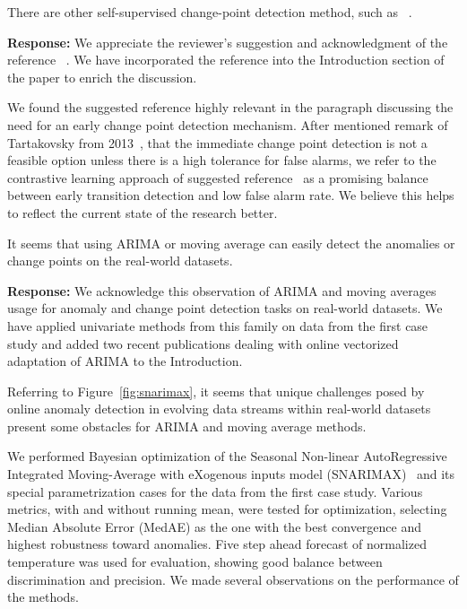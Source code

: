 \documentclass{article}
\makeatletter
\newenvironment{comment}{
\begin{sloppypar}\slshape
\vspace{5 mm}
\color{blue}
 \@beginparpenalty\@M
  \begin{list}{}{\setlength{\topsep}{0ex}%
  \setlength{\leftmargin}{\rightmargin}}\item[]
 \@beginparpenalty\@endparpenalty
}
{\end{list}
\end{sloppypar}
}
\makeatother
\begin{document}
\begin{enumerate}
  \item
        \begin{comment}
        There are other self-supervised change-point detection method, such as ~\cite{Deldari2021}.
        \end{comment}
        {\bf Response:}
        We appreciate the reviewer's suggestion and acknowledgment of the reference ~\cite{Deldari2021}. We have incorporated the reference into the Introduction section of the paper to enrich the discussion.

        We found the suggested reference highly relevant in the paragraph discussing the need for an early change point detection mechanism. After mentioned remark of Tartakovsky from 2013~\cite{Tartakovsky2013}, that the immediate change point detection is not a feasible option unless there is a high tolerance for false alarms, we refer to the contrastive learning approach of suggested reference~\cite{Deldari2021} as a promising balance between early transition detection and low false alarm rate. We believe this helps to reflect the current state of the research better.
  \item
        \begin{comment}
        It seems that using ARIMA or moving average can easily detect the anomalies or change points on the real-world datasets.
        \end{comment}
        {\bf Response:}
        We acknowledge this observation of ARIMA and moving averages usage for anomaly and change point detection tasks on real-world datasets. We have applied univariate methods from this family on data from the first case study and added two recent publications dealing with online vectorized adaptation of ARIMA to the Introduction.

        Referring to Figure~\ref{fig:snarimax}, it seems that unique challenges posed by online anomaly detection in evolving data streams within real-world datasets present some obstacles for ARIMA and moving average methods.

        We performed Bayesian optimization of the Seasonal Non-linear AutoRegressive Integrated Moving-Average with eXogenous inputs model (SNARIMAX)~\cite{Anava2013} and its special parametrization cases for the data from the first case study. Various metrics, with and without running mean, were tested for optimization, selecting Median Absolute Error (MedAE) as the one with the best convergence and highest robustness toward anomalies. Five step ahead forecast of normalized temperature was used for evaluation, showing good balance between discrimination and precision. We made several observations on the performance of the methods.


\end{enumerate}
\end{document}
